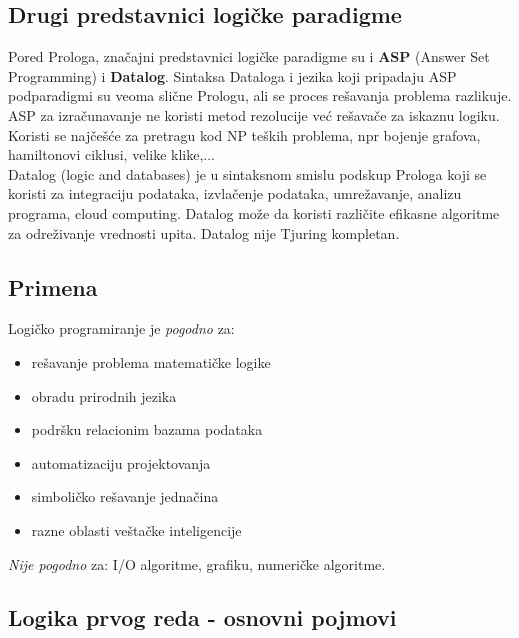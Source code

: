 \documentclass[../main.tex]{subfiles}
\begin{document}
\subsection{Drugi predstavnici logičke paradigme}
Pored Prologa, značajni predstavnici logičke paradigme su i {\bf ASP} (Answer Set Programming) i {\bf Datalog}. Sintaksa Dataloga i jezika koji pripadaju ASP podparadigmi su veoma slične Prologu, ali se proces rešavanja problema razlikuje.
ASP za izračunavanje ne koristi metod rezolucije već rešavače za iskaznu logiku. Koristi se najčešće za pretragu kod NP teških problema, npr bojenje grafova, hamiltonovi ciklusi, velike klike,...
\\
Datalog (logic and databases) je u sintaksnom smislu podskup Prologa koji se koristi za integraciju podataka, izvlačenje podataka, umrežavanje, analizu programa, cloud computing. Datalog može da koristi različite efikasne algoritme za odreživanje vrednosti upita. Datalog  nije Tjuring kompletan.


\subsection{Primena}
\begin{multicols}{2}
Logičko programiranje je {\it pogodno} za:
\begin{itemize}
	\item rešavanje problema matematičke logike
	\item obradu prirodnih jezika
	\item podršku relacionim bazama podataka
	\item automatizaciju projektovanja
	\item simboličko rešavanje jednačina
	\item razne oblasti veštačke inteligencije
\end{itemize}
\end{multicols}
{\it Nije pogodno} za: 
	I/O algoritme, 
	grafiku, 
	numeričke algoritme.

\subsection{Logika prvog reda - osnovni pojmovi}
\end{document}
